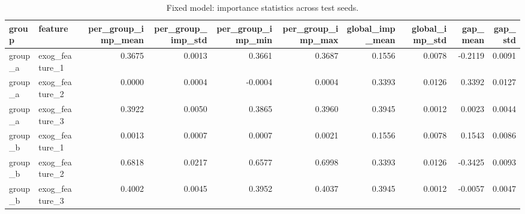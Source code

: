 \begin{table}
\caption{Fixed model: importance statistics across test seeds.}
\label{tab:04_fixed_model_importance}
\begin{tabular}{llrrrrrrrr}
\toprule
group & feature & per_group_imp_mean & per_group_imp_std & per_group_imp_min & per_group_imp_max & global_imp_mean & global_imp_std & gap_mean & gap_std \\
\midrule
group_a & exog_feature_1 & 0.3675 & 0.0013 & 0.3661 & 0.3687 & 0.1556 & 0.0078 & -0.2119 & 0.0091 \\
group_a & exog_feature_2 & 0.0000 & 0.0004 & -0.0004 & 0.0004 & 0.3393 & 0.0126 & 0.3392 & 0.0127 \\
group_a & exog_feature_3 & 0.3922 & 0.0050 & 0.3865 & 0.3960 & 0.3945 & 0.0012 & 0.0023 & 0.0044 \\
group_b & exog_feature_1 & 0.0013 & 0.0007 & 0.0007 & 0.0021 & 0.1556 & 0.0078 & 0.1543 & 0.0086 \\
group_b & exog_feature_2 & 0.6818 & 0.0217 & 0.6577 & 0.6998 & 0.3393 & 0.0126 & -0.3425 & 0.0093 \\
group_b & exog_feature_3 & 0.4002 & 0.0045 & 0.3952 & 0.4037 & 0.3945 & 0.0012 & -0.0057 & 0.0047 \\
\bottomrule
\end{tabular}
\end{table}
